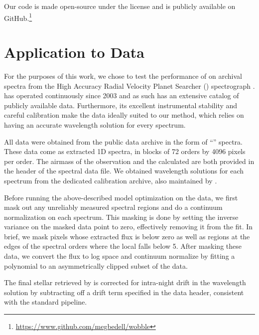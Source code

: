 \documentclass[modern]{aastex62}
\begin{document}
Our code is made open-source under the  license and is publicly available on GitHub.\footnote{\url{https://www.github.com/megbedell/wobble}}



\section{Application to \HARPS Data}
\label{s:results}

For the purposes of this work, we chose to test the performance of \wobble on archival spectra from the High Accuracy Radial Velocity Planet Searcher (\HARPS) spectrograph \citep{Mayor2003}. 
\HARPS has operated continuously since 2003 and as such has an extensive catalog of publicly available data. 
Furthermore, its excellent instrumental stability and careful calibration make the data ideally suited to our method, which relies on having an accurate wavelength solution for every spectrum. 

All data were obtained from the  public data archive in the form of ``'' spectra. 
These data come as extracted 1D spectra, in blocks of 72 orders by 4096 pixels per order.
The airmass of the observation and the calculated \BERV are both provided in the  header of the spectral data file. 
We obtained wavelength solutions for each spectrum from the dedicated \HARPS calibration archive, also maintained by . 

Before running the above-described model optimization on the data, we first mask out any unreliably measured spectral regions and do a continuum normalization on each spectrum. 
This masking is done by setting the inverse variance on the masked data point to zero, effectively removing it from the fit. 
In brief, we mask pixels whose extracted flux is below zero as well as regions at the edges of the spectral orders where the local \SNR falls below 5. 
After masking these data, we convert the flux to log space and continuum normalize by fitting a polynomial to an asymmetrically clipped subset of the data. 

The final stellar \RV retrieved by \wobble is corrected for intra-night drift in the wavelength solution by subtracting off a drift term specified in the data header, consistent with the standard \HARPS pipeline. 
\end{document}
